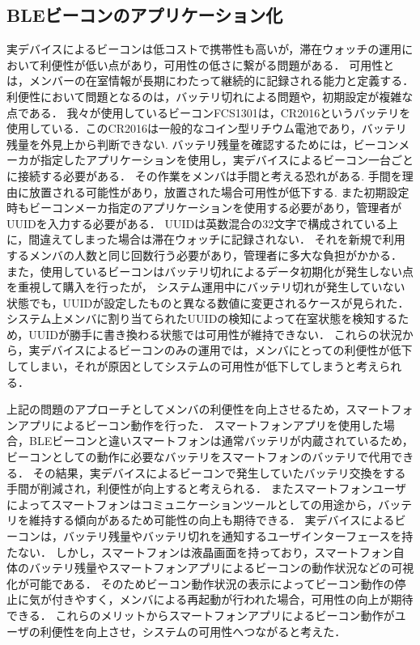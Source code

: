 \subsection{ BLEビーコンのアプリケーション化}
実デバイスによるビーコンは低コストで携帯性も高いが，滞在ウォッチの運用において利便性が低い点があり，可用性の低さに繋がる問題がある．
可用性とは，メンバーの在室情報が長期にわたって継続的に記録される能力と定義する．  
利便性において問題となるのは，バッテリ切れによる問題や，初期設定が複雑な点である．
我々が使用しているビーコンFCS1301は，CR2016というバッテリを使用している．このCR2016は一般的なコイン型リチウム電池であり，バッテリ残量を外見上から判断できない.
バッテリ残量を確認するためには，ビーコンメーカが指定したアプリケーションを使用し，実デバイスによるビーコン一台ごとに接続する必要がある．
その作業をメンバは手間と考える恐れがある.
手間を理由に放置される可能性があり，放置された場合可用性が低下する.
また初期設定時もビーコンメーカ指定のアプリケーションを使用する必要があり，管理者がUUIDを入力する必要がある．
UUIDは英数混合の32文字で構成されている上に，間違えてしまった場合は滞在ウォッチに記録されない．
それを新規で利用するメンバの人数と同じ回数行う必要があり，管理者に多大な負担がかかる．
また，使用しているビーコンはバッテリ切れによるデータ初期化が発生しない点を重視して購入を行ったが，
システム運用中にバッテリ切れが発生していない状態でも，UUIDが設定したものと異なる数値に変更されるケースが見られた．
システム上メンバに割り当てられたUUIDの検知によって在室状態を検知するため，UUIDが勝手に書き換わる状態では可用性が維持できない．
これらの状況から，実デバイスによるビーコンのみの運用では，メンバにとっての利便性が低下してしまい，それが原因としてシステムの可用性が低下してしまうと考えられる．

上記の問題のアプローチとしてメンバの利便性を向上させるため，スマートフォンアプリによるビーコン動作を行った．
スマートフォンアプリを使用した場合，BLEビーコンと違いスマートフォンは通常バッテリが内蔵されているため，ビーコンとしての動作に必要なバッテリをスマートフォンのバッテリで代用できる．
その結果，実デバイスによるビーコンで発生していたバッテリ交換をする手間が削減され，利便性が向上すると考えられる．
またスマートフォンユーザによってスマートフォンはコミュニケーションツールとしての用途から，バッテリを維持する傾向があるため可能性の向上も期待できる．
実デバイスによるビーコンは，バッテリ残量やバッテリ切れを通知するユーザインターフェースを持たない．
しかし，スマートフォンは液晶画面を持っており，スマートフォン自体のバッテリ残量やスマートフォンアプリによるビーコンの動作状況などの可視化が可能である．
そのためビーコン動作状況の表示によってビーコン動作の停止に気が付きやすく，メンバによる再起動が行われた場合，可用性の向上が期待できる．
これらのメリットからスマートフォンアプリによるビーコン動作がユーザの利便性を向上させ，システムの可用性へつながると考えた．


